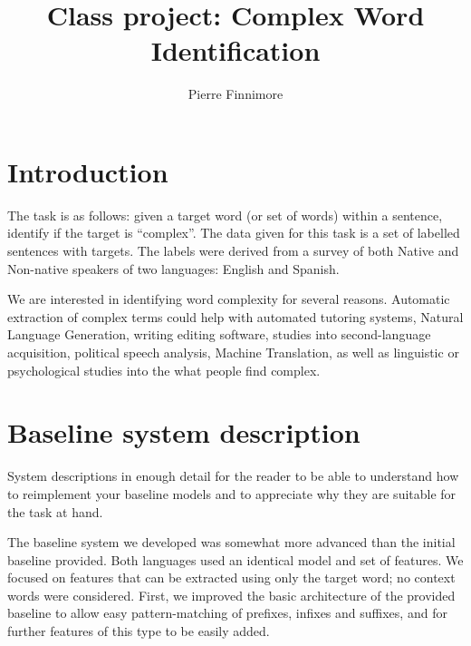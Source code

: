 \documentclass[11pt,a4paper]{article}
\title{Class project: Complex Word Identification}
\author{Pierre Finnimore}
\date{}
\begin{document}
\maketitle
\begin{abstract}

\end{abstract}

\section{Introduction}

The task is as follows: given a target word (or set of words) within a sentence, identify if the target is \enquote{complex}. The data given for this task is a set of labelled sentences with targets. The labels were derived from a survey of both Native and Non-native speakers of two languages: English and Spanish.

We are interested in identifying word complexity for several reasons. Automatic extraction of complex terms could help with automated tutoring systems, Natural Language Generation, writing editing software, studies into second-language acquisition, political speech analysis, Machine Translation, as well as linguistic or psychological studies into the what people find complex. 

\section{Baseline system description}

System descriptions in enough detail for the reader to be able to understand how to reimplement your baseline models and to appreciate why they are suitable for the task at hand.

The baseline system we developed was somewhat more advanced than the initial baseline provided. Both languages used an identical model and set of features. We focused on features that can be extracted using only the target word; no context words were considered. First, we improved the basic architecture of the provided baseline to allow easy pattern-matching of prefixes, infixes and suffixes, and for further features of this type to be easily added.\\
\end{document}
